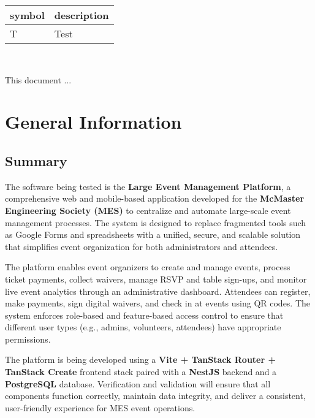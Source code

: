 \documentclass[12pt, titlepage]{article}
\begin{document}
\renewcommand{\arraystretch}{1.2}
\begin{tabular}{l l} 
  \toprule		
  \textbf{symbol} & \textbf{description}\\
  \midrule 
  T & Test\\
  \bottomrule
\end{tabular}\\



\newpage


This document ... 

\section{General Information}

\subsection{Summary}

The software being tested is the \textbf{Large Event Management Platform}, a comprehensive web and mobile-based application developed for the \textbf{McMaster Engineering Society (MES)} to centralize and automate large-scale event management processes. The system is designed to replace fragmented tools such as Google Forms and spreadsheets with a unified, secure, and scalable solution that simplifies event organization for both administrators and attendees.

The platform enables event organizers to create and manage events, process ticket payments, collect waivers, manage RSVP and table sign-ups, and monitor live event analytics through an administrative dashboard. Attendees can register, make payments, sign digital waivers, and check in at events using QR codes. The system enforces role-based and feature-based access control to ensure that different user types (e.g., admins, volunteers, attendees) have appropriate permissions.

The platform is being developed using a \textbf{Vite + TanStack Router + TanStack Create} frontend stack paired with a \textbf{NestJS} backend and a \textbf{PostgreSQL} database. Verification and validation will ensure that all components function correctly, maintain data integrity, and deliver a consistent, user-friendly experience for MES event operations.
\end{document}
